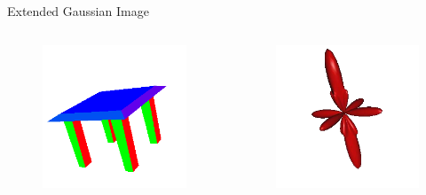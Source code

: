\documentclass{beamer}
\begin{document}
\begin{frame}{Extended Gaussian Image}

\begin{columns}[c]

\begin{figure}[t]
    \includegraphics[width=\textwidth]{Table.png}
\end{figure}

\begin{figure}[t]
    \includegraphics[width=\textwidth]{EGITable.png}
\end{figure}


\end{columns}
\end{frame}
\end{document}
